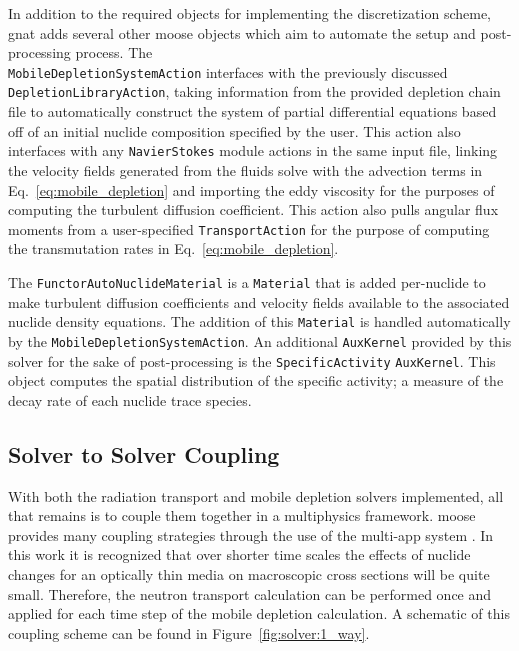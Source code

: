 In addition to the required objects for implementing the discretization scheme, \acrshort{gnat} adds several other \acrshort{moose} objects which aim to automate the setup and post-processing process. The \\\texttt{MobileDepletionSystemAction} interfaces with the previously discussed \texttt{DepletionLibraryAction}, taking information from the provided depletion chain file to automatically construct the system of partial differential equations based off of an initial nuclide composition specified by the user. This action also interfaces with any \texttt{NavierStokes} module actions in the same input file, linking the velocity fields generated from the fluids solve with the advection terms in Eq.~\ref{eq:mobile_depletion} and importing the eddy viscosity for the purposes of computing the turbulent diffusion coefficient. This action also pulls angular flux moments from a user-specified \texttt{TransportAction} for the purpose of computing the transmutation rates in Eq.~\ref{eq:mobile_depletion}. 

The \texttt{FunctorAutoNuclideMaterial} is a \texttt{Material} that is added per-nuclide to make turbulent diffusion coefficients and velocity fields available to the associated nuclide density equations. The addition of this \texttt{Material} is handled automatically by the \texttt{MobileDepletionSystemAction}. An additional \texttt{AuxKernel} provided by this solver for the sake of post-processing is the \texttt{SpecificActivity} \texttt{AuxKernel}. This object computes the spatial distribution of the specific activity; a measure of the decay rate of each nuclide trace species. 

\subsection{Solver to Solver Coupling}
\label{solver:implementation:coupling}

With both the radiation transport and mobile depletion solvers implemented, all that remains is to couple them together in a multiphysics framework. \acrshort{moose} provides many coupling strategies through the use of the multi-app system \cite{moose_coupling}. In this work it is recognized that over shorter time scales the effects of nuclide changes for an optically thin media on macroscopic cross sections will be quite small. Therefore, the neutron transport calculation can be performed once and applied for each time step of the mobile depletion calculation. A schematic of this coupling scheme can be found in Figure~\ref{fig:solver:1_way}.

